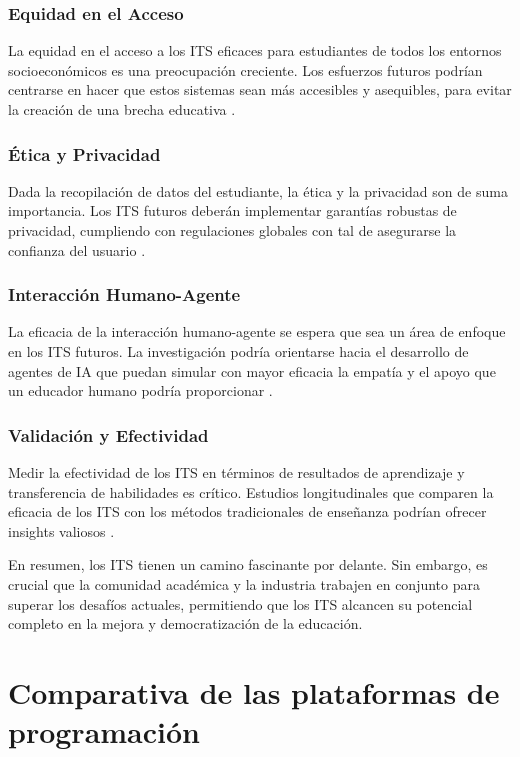 \subsubsection{Equidad en el Acceso}

La equidad en el acceso a los ITS eficaces para estudiantes de todos los entornos socioeconómicos es una preocupación creciente. Los esfuerzos futuros podrían centrarse en hacer que estos sistemas sean más accesibles y asequibles, para evitar la creación de una brecha educativa \cite{Reich2019}.

\subsubsection{Ética y Privacidad}

Dada la recopilación de datos del estudiante, la ética y la privacidad son de suma importancia. Los ITS futuros deberán implementar garantías robustas de privacidad, cumpliendo con regulaciones globales con tal de asegurarse la confianza del usuario \cite{Zawacki-Richter2019}.

\subsubsection{Interacción Humano-Agente}

La eficacia de la interacción humano-agente se espera que sea un área de enfoque en los ITS futuros. La investigación podría orientarse hacia el desarrollo de agentes de IA que puedan simular con mayor eficacia la empatía y el apoyo que un educador humano podría proporcionar \cite{Heffernan2019}.

\subsubsection{Validación y Efectividad}

Medir la efectividad de los ITS en términos de resultados de aprendizaje y transferencia de habilidades es crítico. Estudios longitudinales que comparen la eficacia de los ITS con los métodos tradicionales de enseñanza podrían ofrecer insights valiosos \cite{Corbett2001}.

En resumen, los ITS tienen un camino fascinante por delante. Sin embargo, es crucial que la comunidad académica y la industria trabajen en conjunto para superar los desafíos actuales, permitiendo que los ITS alcancen su potencial completo en la mejora y democratización de la educación.

\section{Comparativa de las plataformas de programación}


